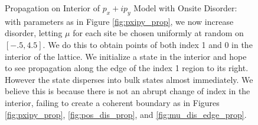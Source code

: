 \documentclass[a4paper]{article}
\begin{document}
\begin{figure}
\centering
{}%
%

%
%
\caption{Propagation on Interior of $p_x + ip_y$ Model with Onsite Disorder: with parameters as in Figure \ref{fig:pxipy_prop}, we now increase disorder, letting $\mu$ for each site be chosen uniformly at random on $[-.5,4.5]$.
We do this to obtain points of both index 1 and 0 in the interior of the lattice.
We initialize a state in the interior and hope to see propagation along the edge of the index 1 region to its right.
However the state disperses into bulk states almost immediately.
We believe this is because there is not an abrupt change of index in the interior, failing to create a coherent boundary as in Figures \ref{fig:pxipy_prop},  \ref{fig:pos_dis_prop}, and \ref{fig:mu_dis_edge_prop}.
}%
\label{fig:mu_dis_interior_prop}%
\end{figure}
\end{document}
